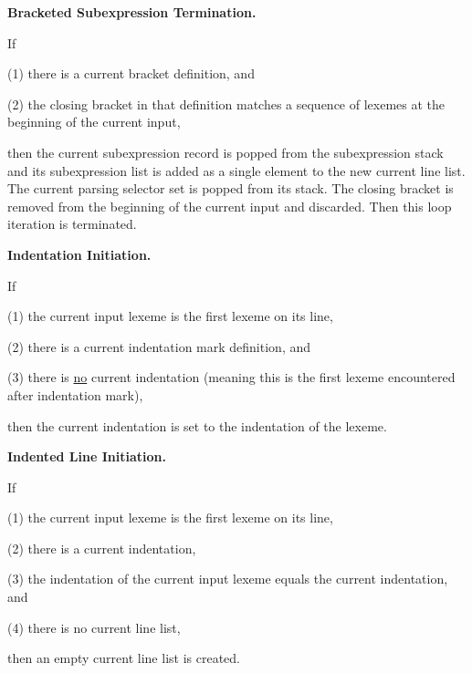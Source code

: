 \documentclass[12pt]{article}
\newenvironment{indpar}[1][0.3in]%
	{\begin{list}{}%
		     {\setlength{\itemsep}{0in}%
		      \setlength{\topsep}{0in}%
		      \setlength{\parsep}{1ex}%
		      \setlength{\labelwidth}{#1}%
		      \setlength{\leftmargin}{#1}%
		      \addtolength{\leftmargin}{\labelsep}}%
	 \item}%
	{\end{list}}
\begin{document}
\begin{indpar}
{\bf Bracketed Subexpression Termination.}%
\begin{indpar}
If
\begin{list}{}
	     {\setlength{\itemsep}{0ex}%
	      \setlength{\topsep}{0ex}%
	      \setlength{\parsep}{0ex}%
	      \setlength{\leftmargin}{0.5in}%
	      \setlength{\rightmargin}{0.5in}}%
\item[(1)] there is a current bracket definition, and
\item[(2)] the closing bracket in that definition matches a sequence
of lexemes at the beginning of the current input,
\end{list}
then the current subexpression record is popped from the subexpression
stack and its subexpression list is added as a single element to the
new current line list.
The current parsing selector set is popped
from its stack.
The closing bracket is removed from the beginning of the current input and
discarded.
Then this loop iteration is terminated.
\end{indpar}

{\bf Indentation Initiation.}%
\begin{indpar}
If
\begin{list}{}
	     {\setlength{\itemsep}{0ex}%
	      \setlength{\topsep}{0ex}%
	      \setlength{\parsep}{0ex}%
	      \setlength{\leftmargin}{0.5in}%
	      \setlength{\rightmargin}{0.5in}}%
\item[(1)] the current input lexeme is the first lexeme on its line,
\item[(2)] there is a current indentation mark definition, and
\item[(3)] there is \underline{no} current indentation (meaning this is
the first lexeme encountered after indentation mark),
\end{list}
then the current indentation is set to the indentation of the lexeme.
\end{indpar}

{\bf Indented Line Initiation.}%
\begin{indpar}
If
\begin{list}{}
	     {\setlength{\itemsep}{0ex}%
	      \setlength{\topsep}{0ex}%
	      \setlength{\parsep}{0ex}%
	      \setlength{\leftmargin}{0.5in}%
	      \setlength{\rightmargin}{0.5in}}%
\item[(1)] the current input lexeme is the first lexeme on its line,
\item[(2)] there is a current indentation,
\item[(3)] the indentation of the current input lexeme equals
the current indentation, and
\item[(4)] there is no current line list,
\end{list}
then an empty current line list is created.
\end{indpar}


\end{indpar}
\end{document}
